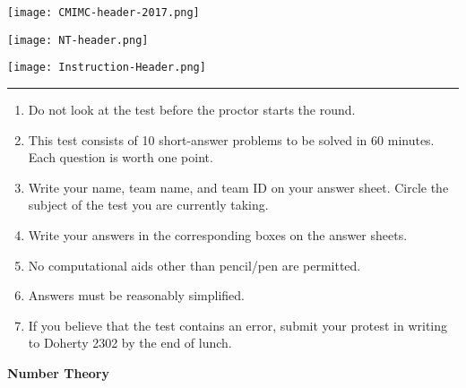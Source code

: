 \documentclass[10pt]{article}
\begin{document}
\thispagestyle{empty}
\begin{center}

\vspace*{90pt}

\texttt{[image: CMIMC-header-2017.png]}

\texttt{[image: NT-header.png]}

\vspace{1.6in}

\texttt{[image: Instruction-Header.png]}
\noindent\rule{17.7cm}{2pt}
\end{center}

\vspace{10pt}

\begin{enumerate}
\large
\item Do not look at the test before the proctor starts the round.

\item This test consists of 10 short-answer problems to be solved in 60 minutes.
	Each question is worth one point.

\item Write your name, team name, and team ID on your answer sheet. Circle the
	subject of the test you are currently taking.

\item Write your answers in the corresponding boxes on the answer sheets.

\item No computational aids other than pencil/pen are permitted.

\item Answers must be reasonably simplified.

\item If you believe that the test contains an error, submit your protest in writing to Doherty 2302 by the end of lunch.
\end{enumerate}
\newpage

\begin{center}
\huge\textbf{Number Theory}\normalsize

\vspace{3pt}
\end{center}
\end{document}
